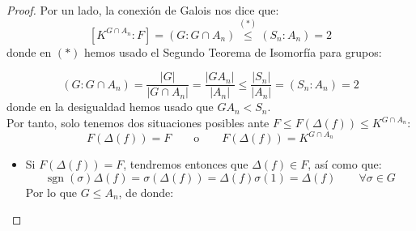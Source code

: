 \begin{prop}
\begin{proof}
        Por un lado, la conexión de Galois nos dice que:
        \begin{equation*}
            \left[K^{G\cap A_n} : F\right] = (G : G\cap A_n) \stackrel{(\ast)}{\leq} (S_n : A_n) = 2
        \end{equation*}
        donde en $(\ast)$ hemos usado el Segundo Teorema de Isomorfía para grupos: 
        \begin{figure}[H]
            \centering
        \end{figure}
        \begin{equation*}
            (G : G\cap A_n) = \dfrac{|G|}{|G\cap A_n|} = \dfrac{|GA_n|}{|A_n|} \leq \dfrac{|S_n|}{|A_n|} = (S_n : A_n) = 2
        \end{equation*}
        donde en la desigualdad hemos usado que $GA_n < S_n$.\\
        \noindent
        Por tanto, solo tenemos dos situaciones posibles ante $F\leq F(\Delta(f)) \leq K^{G\cap A_n}$:
        \begin{equation*}
            F(\Delta(f)) = F \qquad \text{o}\qquad F(\Delta(f)) = K^{G\cap A_n}
        \end{equation*}
        \begin{itemize}
            \item Si $F(\Delta(f)) = F$, tendremos entonces que $\Delta(f)\in F$, así como que:
                \begin{equation*}
                    \operatorname{sgn}(\sigma)\Delta(f) = \sigma(\Delta(f)) = \Delta(f)\sigma(1) = \Delta(f)\qquad \forall \sigma\in G
                \end{equation*}
                Por lo que $G\leq A_n$, de donde:
                \begin{equation*}

\end{equation*}
\end{itemize}
\end{proof}
\end{prop}
